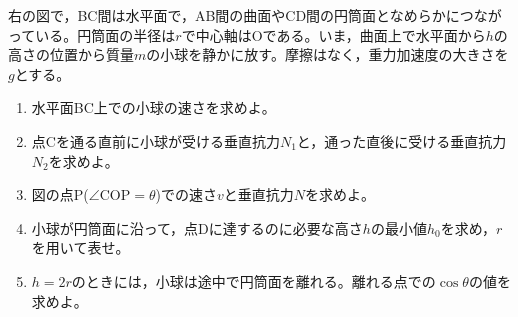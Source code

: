 \hakosyokika
\item
    \begin{mawarikomi}{150pt}{}
        右の図で，BC間は水平面で，AB間の曲面やCD間の円筒面となめらかにつながっている。円筒面の半径は$r$で中心軸はOである。いま，曲面上で水平面から$h$の高さの位置から質量$m$の小球を静かに放す。摩擦はなく，重力加速度の大きさを$g$とする。
        \begin{enumerate}
            \item 水平面BC上での小球の速さを求めよ。
            \item 点Cを通る直前に小球が受ける垂直抗力$N_1$と，通った直後に受ける垂直抗力$N_2$を求めよ。
            \item 図の点P($\angle \mathrm{COP}=\theta $)での速さ$v$と垂直抗力$N$を求めよ。
            \item 小球が円筒面に沿って，点Dに達するのに必要な高さ$h$の最小値$h_0$を求め，$r$を用いて表せ。
            \item $h=2r$のときには，小球は途中で円筒面を離れる。離れる点での$\cos{\theta }$の値を求めよ。
        \end{enumerate}
    \end{mawarikomi}